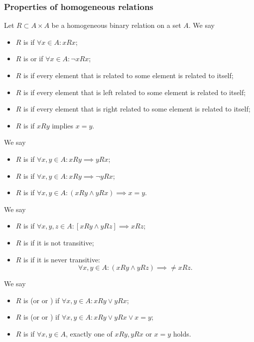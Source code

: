 \subsubsection{Properties of homogeneous relations}
\begin{definition}
Let $R\subset A\times A$ be a homogeneous binary relation on a set $A$. We say
\begin{itemize}
\item $R$ is  if $\forall x\in A: xRx$;
\item $R$ is  or  if $\forall x\in A: \neg xRx$;
\item $R$ is  if every element that is related to some element is related to itself;
\item $R$ is  if every element that is left related to some element is related to itself;
\item $R$ is  if every element that is right related to some element is related to itself;
\item $R$ is  if $xRy$ implies $x=y$.
\end{itemize}
We say
\begin{itemize}
\item $R$ is  if $\forall x,y\in A: xRy \implies yRx$;
\item $R$ is  if $\forall x,y\in A: xRy \implies \neg yRx$;
\item $R$ is  if $\forall x,y\in A: (xRy\land yRx) \implies x=y$.
\end{itemize}
We say
\begin{itemize}
\item $R$ is  if $\forall x,y,z\in A: [xRy \land yRz] \implies xRz$;
\item $R$ is  if it is not transitive;
\item $R$ is  if it is never transitive:
\[ \forall x,y\in A: (xRy\land yRz) \implies \neq xRz.\]
\end{itemize}
We say
\begin{itemize}
\item $R$ is  (or  or ) if $\forall x,y\in A: xRy \lor yRx$;
\item $R$ is  (or  or ) if $\forall x,y\in A: xRy \lor yRx \lor x=y$;
\item $R$ is  if $\forall x,y\in A$, exactly one of $xRy, yRx$ or $x=y$ holds.

\end{itemize}
\end{definition}
